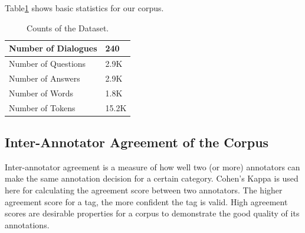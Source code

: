\documentclass[bsc,frontabs,twoside,singlespacing,parskip,deptreport]{infthesis}     %
\begin{document}
Table\ref{tab:datacount} shows basic statistics for our corpus.

\begin{table}[]
\centering
\begin{tabular}{|l|l|}
\hline
Number of Dialogues & 240   \\ \hline
Number of Questions & 2.9K  \\ \hline
Number of Answers   & 2.9K  \\ \hline
Number of Words     & 1.8K  \\ \hline
Number of Tokens    & 15.2K \\ \hline
\end{tabular}
\caption{Counts of the Dataset.}
\label{tab:datacount}
\end{table}




\subsection*{Inter-Annotator Agreement of the Corpus}

Inter-annotator agreement is a measure of how well two (or more) annotators can make the same annotation decision for a certain category. Cohen's Kappa is used here for calculating the agreement score between two annotators. The higher agreement score for a tag, the more confident the tag is valid. High agreement scores are desirable properties for a corpus to demonstrate the good quality of its annotations. 
\end{document}
